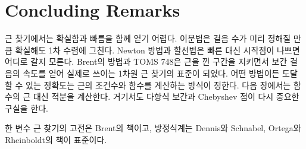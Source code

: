 \section{Concluding Remarks}

근 찾기에서는 확실함과 빠름을 함께 얻기 어렵다. 이분법은 걸음 수가 미리 정해질 만큼 확실해도 1차 수렴에 그친다. Newton 방법과 할선법은 빠른 대신 시작점이 나쁘면 어디로 갈지 모른다. Brent의 방법과 TOMS 748은 근을 낀 구간을 지키면서 보간 걸음의 속도를 얻어 실제로 쓰이는 1차원 근 찾기의 표준이 되었다. 어떤 방법이든 도달할 수 있는 정확도는 근의 조건수와 함수를 계산하는 방식이 정한다. 다음 장에서는 함수의 근 대신 적분을 계산한다. 거기서도 다항식 보간과 Chebyshev 점이 다시 중요한 구실을 한다.

한 변수 근 찾기의 고전은 Brent의 책\cite{brent1973}이고, 방정식계는 Dennis와 Schnabel\cite{dennis1996}, Ortega와 Rheinboldt\cite{ortega2000}의 책이 표준이다.

\chapterreferences

